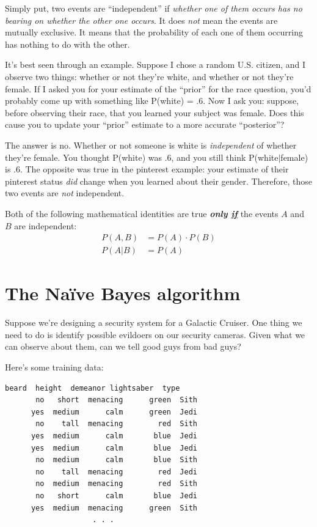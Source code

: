 Simply put, two events are ``independent'' if \textit{whether one of them
occurs has no bearing on whether the other one occurs}. It does \textit{not}
mean the events are mutually exclusive. It means that the probability of each
one of them occurring has nothing to do with the other.

It's best seen through an example. Suppose I chose a random U.S. citizen, and
I observe two things: whether or not they're white, and whether or not they're
female. If I asked you for your estimate of the ``prior'' for the race
question, you'd probably come up with something like P(white) = .6. Now I ask
you: suppose, before observing their race, that you learned your subject was
female. Does this cause you to update your ``prior'' estimate to a more
accurate ``posterior''?

The answer is no. Whether or not someone is white is \textit{independent} of
whether they're female. You thought P(white) was .6, and you still think
P(white$|$female) is .6. The opposite was true in the pinterest example: your
estimate of their pinterest status \textit{did} change when you learned about
their gender. Therefore, those two events are \textit{not} independent.

Both of the following mathematical identities are true \textit{\textbf{only
\underline{if}}} the events $A$ and $B$ are independent:
\vspace{-.2in}
\begin{align*}
P(A,B) &= P(A) \cdot P(B) \\
P(A|B) &= P(A)
\end{align*}

\section{The Na\"{i}ve Bayes algorithm}

Suppose we're designing a security system for a Galactic Cruiser. One thing we
need to do is identify possible evildoers on our security cameras. Given what
we can observe about them, can we tell good guys from bad guys?

Here's some training data:
\begin{Verbatim}[fontsize=\small,samepage=true,frame=none]
    beard  height  demeanor lightsaber  type
       no   short  menacing      green  Sith
      yes  medium      calm      green  Jedi
       no    tall  menacing        red  Sith
      yes  medium      calm       blue  Jedi
      yes  medium      calm       blue  Jedi
       no  medium      calm       blue  Sith
       no    tall  menacing        red  Jedi
       no  medium  menacing        red  Sith
       no   short      calm       blue  Jedi
      yes  medium  menacing      green  Sith
                    . . .
\end{Verbatim}

